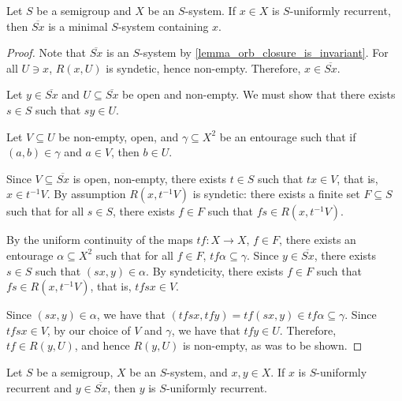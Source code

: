 \begin{lemma}
    \label{lemma_orb_closure_of_ur_is_minimal}
    \leanok{}
    Let $S$ be a semigroup and $X$ be an $S$-system.  If $x \in X$ is $S$-uniformly recurrent, then $\overline{Sx}$ is a minimal $S$-system containing $x$.
\end{lemma}

\begin{proof}
\leanok{}
    Note that $\overline{Sx}$ is an $S$-system by \cref{lemma_orb_closure_is_invariant}. For all $U \ni x$, $R(x,U)$ is syndetic, hence non-empty.  Therefore, $x \in \overline{Sx}$.
    
    Let $y \in \overline{Sx}$ and $U \subseteq \overline{Sx}$ be open and non-empty.  We must show that there exists $s \in S$ such that $sy \in U$.

    Let $V \subseteq U$ be non-empty, open, and $\gamma \subseteq X^2$ be an entourage such that if $(a,b) \in \gamma$ and $a \in V$, then $b \in U$.
    
    Since $V \subseteq \overline{Sx}$ is open, non-empty, there exists $t \in S$ such that $tx \in V$, that is, $x \in t^{-1} V$.  By assumption $R(x,t^{-1} V)$ is syndetic: there exists a finite set $F \subseteq S$ such that for all $s \in S$, there exists $f \in F$ such that $fs \in R(x,t^{-1}V)$.

    By the uniform continuity of the maps $tf: X \to X$, $f \in F$, there exists an entourage $\alpha \subseteq X^2$ such that for all $f \in F$, $tf \alpha \subseteq \gamma$.  Since $y \in \overline{Sx}$, there exists $s \in S$ such that $(sx,y) \in \alpha$.  By syndeticity, there exists $f \in F$ such that $fs \in R(x,t^{-1}V)$, that is, $tfs x \in V$.

    Since $(sx,y) \in \alpha$, we have that $(tfsx,tfy) = tf(sx,y) \in tf \alpha \subseteq \gamma$.  Since $tfsx \in V$, by our choice of $V$ and $\gamma$, we have that $tfy \in U$.  Therefore, $tf \in R(y,U)$, and hence $R(y,U)$ is non-empty, as was to be shown.
\end{proof}

\begin{lemma}
    \label{lemma_in_orb_clos_of_ur_implies_ur}
    \leanok{}
    Let $S$ be a semigroup, $X$ be an $S$-system, and $x, y \in X$. If $x$ is $S$-uniformly recurrent and $y \in \overline{Sx}$, then $y$ is $S$-uniformly recurrent. 
\end{lemma}

